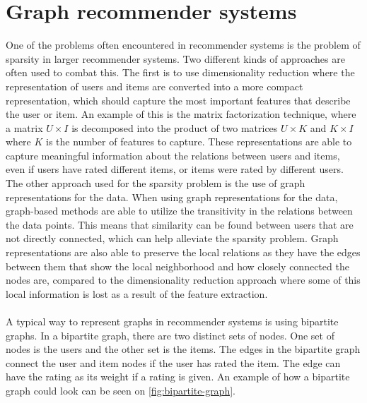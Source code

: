 \section{Graph recommender systems}\label{sec:graph-rec-sys}
One of the problems often encountered in recommender systems is the problem of sparsity in larger recommender systems.
Two different kinds of approaches are often used to combat this. 
The first is to use dimensionality reduction where the representation of users and items are converted into a more compact representation, which should capture the most important features that describe the user or item.
An example of this is the matrix factorization technique, where a matrix $U \times I$ is decomposed into the product of two matrices $U \times K $ and $ K \times I$ where $K$ is the number of features to capture.
These representations are able to capture meaningful information about the relations between users and items, even if users have rated different items, or items were rated by different users. 
The other approach used for the sparsity problem is the use of graph representations for the data.
When using graph representations for the data, graph-based methods are able to utilize the transitivity in the relations between the data points. 
This means that similarity can be found between users that are not directly connected, which can help alleviate the sparsity problem.
Graph representations are also able to preserve the local relations as they have the edges between them that show the local neighborhood and how closely connected the nodes are, compared to the dimensionality reduction approach where some of this local information is lost as a result of the feature extraction\cite{RecommenderHandbook2015}.
\\\\
A typical way to represent graphs in recommender systems is using bipartite graphs.
In a bipartite graph, there are two distinct sets of nodes.
One set of nodes is the users and the other set is the items.
The edges in the bipartite graph connect the user and item nodes if the user has rated the item. 
The edge can have the rating as its weight if a rating is given.
An example of how a bipartite graph could look can be seen on \autoref{fig:bipartite-graph}.
